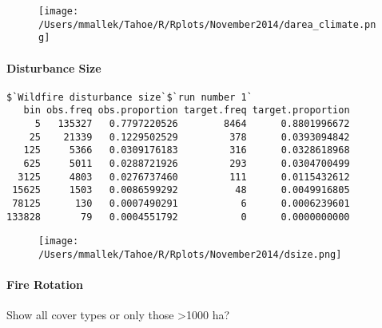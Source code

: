 \begin{figure}
\centering
\texttt{[image: /Users/mmallek/Tahoe/R/Rplots/November2014/darea\_climate.png]}
\caption{}
\label{darea_climate}
\end{figure}

\paragraph{Disturbance Size}
\begin{verbatim}
$`Wildfire disturbance size`$`run number 1`
   bin obs.freq obs.proportion target.freq target.proportion
     5   135327   0.7797220526        8464      0.8801996672
    25    21339   0.1229502529         378      0.0393094842
   125     5366   0.0309176183         316      0.0328618968
   625     5011   0.0288721926         293      0.0304700499
  3125     4803   0.0276737460         111      0.0115432612
 15625     1503   0.0086599292          48      0.0049916805
 78125      130   0.0007490291           6      0.0006239601
133828       79   0.0004551792           0      0.0000000000
\end{verbatim}

\begin{figure}
\centering
\texttt{[image: /Users/mmallek/Tahoe/R/Rplots/November2014/dsize.png]}
\caption{}
\label{dsize}
\end{figure}

\paragraph{Fire Rotation}
Show all cover types or only those \textgreater 1000 ha?

